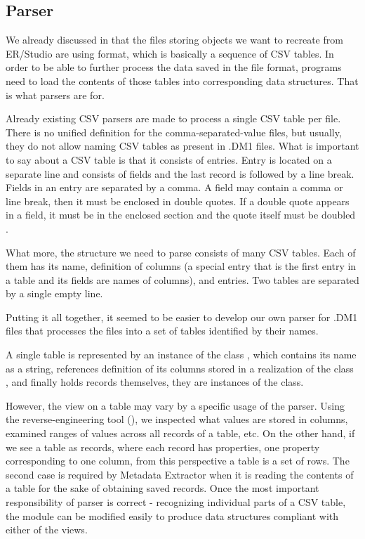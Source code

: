 \subsection{Parser}
\label{subsec:dm1_parser}

We already discussed in  that the files storing objects we want to recreate from ER/Studio are using format, which is basically a sequence of CSV tables. 
In order to be able to further process the data saved in the file format, programs need to load the contents of those tables into corresponding data structures. That is what parsers are for.

Already existing CSV parsers are made to process a single CSV table per file. There is no unified definition for the comma-separated-value files, but usually, they do not allow naming CSV tables as present in .DM1 files.
What is important to say about a CSV table is that it consists of entries. 
Entry is located on a separate line and consists of fields and the last record is followed by a line break. 
Fields in an entry are separated by a comma.
A field may contain a comma or line break, then it must be enclosed in double quotes.
If a double quote appears in a field, it must be in the enclosed section and the quote itself must be doubled \cite{RfcCSV}.

What more, the structure we need to parse consists of many CSV tables. Each of them has its name, definition of columns (a special entry that is the first entry in a table and its fields are names of columns), and entries.
Two tables are separated by a single empty line.

Putting it all together, it seemed to be easier to develop our own parser for .DM1 files that processes the files into a set of tables identified by their names.

A single table is represented by an instance of the class , which contains its name as a string, references definition of its columns stored in a realization of the class , and finally holds records themselves, they are instances of the  class.

However, the view on a table may vary by a specific usage of the parser. 
Using the reverse-engineering tool (), we inspected what values are stored in columns, examined ranges of values across all records of a table, etc.
On the other hand, if we see a table as records, where each record has properties, one property corresponding to one column, from this perspective a table is a set of rows.
The second case is required by Metadata Extractor when it is reading the contents of a table for the sake of obtaining saved records. 
Once the most important responsibility of parser is correct - recognizing individual parts of a CSV table, the module can be modified easily to produce data structures compliant with either of the views.

